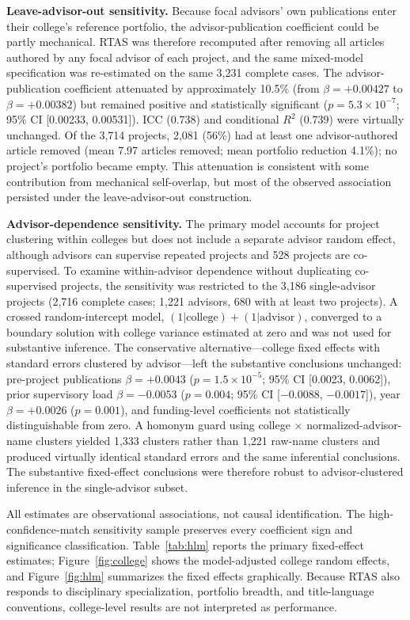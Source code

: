 \documentclass[11pt]{article}
\begin{document}
\textbf{Leave-advisor-out sensitivity.} Because focal advisors' own publications enter their college's reference portfolio, the advisor-publication coefficient could be partly mechanical. RTAS was therefore recomputed after removing all articles authored by any focal advisor of each project, and the same mixed-model specification was re-estimated on the same 3,231 complete cases. The advisor-publication coefficient attenuated by approximately 10.5\% (from $\beta=+0.00427$ to $\beta=+0.00382$) but remained positive and statistically significant ($p=5.3\times10^{-7}$; 95\% CI [0.00233, 0.00531]). ICC (0.738) and conditional $R^2$ (0.739) were virtually unchanged. Of the 3,714 projects, 2,081 (56\%) had at least one advisor-authored article removed (mean 7.97 articles removed; mean portfolio reduction 4.1\%); no project's portfolio became empty. This attenuation is consistent with some contribution from mechanical self-overlap, but most of the observed association persisted under the leave-advisor-out construction.

\textbf{Advisor-dependence sensitivity.} The primary model accounts for project clustering within colleges but does not include a separate advisor random effect, although advisors can supervise repeated projects and 528 projects are co-supervised. To examine within-advisor dependence without duplicating co-supervised projects, the sensitivity was restricted to the 3,186 single-advisor projects (2,716 complete cases; 1,221 advisors, 680 with at least two projects). A crossed random-intercept model, $(1|\mathrm{college})+(1|\mathrm{advisor})$, converged to a boundary solution with college variance estimated at zero and was not used for substantive inference. The conservative alternative---college fixed effects with standard errors clustered by advisor---left the substantive conclusions unchanged: pre-project publications $\beta=+0.0043$ ($p=1.5\times10^{-5}$; 95\% CI [0.0023, 0.0062]), prior supervisory load $\beta=-0.0053$ ($p=0.004$; 95\% CI [$-0.0088$, $-0.0017$]), year $\beta=+0.0026$ ($p=0.001$), and funding-level coefficients not statistically distinguishable from zero. A homonym guard using college $\times$ normalized-advisor-name clusters yielded 1,333 clusters rather than 1,221 raw-name clusters and produced virtually identical standard errors and the same inferential conclusions. The substantive fixed-effect conclusions were therefore robust to advisor-clustered inference in the single-advisor subset.

All estimates are observational associations, not causal identification. The high-confidence-match sensitivity sample preserves every coefficient sign and significance classification. Table~\ref{tab:hlm} reports the primary fixed-effect estimates; Figure~\ref{fig:college} shows the model-adjusted college random effects, and Figure~\ref{fig:hlm} summarizes the fixed effects graphically. Because RTAS also responds to disciplinary specialization, portfolio breadth, and title-language conventions, college-level results are not interpreted as performance.
\end{document}
